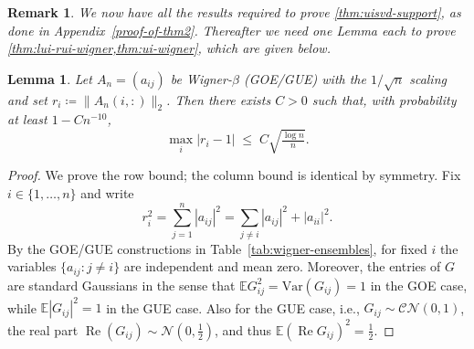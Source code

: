 \documentclass[11pt,a4paper]{article}
\newtheorem{lemma}[theorem]{Lemma}
\newtheorem{remark}{Remark}[section]
\newcommand{\E}{\mathbb{E}}
\newcommand{\Var}{\mathrm{Var}}
\begin{document}
\begin{remark}
We now have all the results required to prove \cref{thm:uisvd-support}, as done in Appendix~\ref{proof-of-thm2}. Thereafter we need one Lemma each to prove \cref{thm:lui-rui-wigner,thm:ui-wigner}, which are given below.
\end{remark}
\begin{lemma}\label{lem:wigner-rowcol-norms}
Let $A_n = (a_{ij})$ be Wigner-$\beta$ (GOE/GUE) with the $1/\sqrt n$ scaling and set
$r_i\coloneq \|A_n(i,:)\|_2$.
Then there exists $C>0$ such that, with probability at least $1-C n^{-10}$,
\begin{equation}\label{eq:wigner-rowcol-norms}
\max_i \bigl|r_i-1\bigr| \;\le\; C\sqrt{\tfrac{\log n}{n}}.
\end{equation}
\end{lemma}
\begin{proof}
We prove the row bound; the column bound is identical by symmetry. Fix $i\in\{1,\dots,n\}$ and write
\begin{equation}
r_i^2=\sum_{j=1}^n |a_{ij}|^2=\sum_{j\neq i}|a_{ij}|^2+|a_{ii}|^2.
\end{equation}
By the GOE/GUE constructions in Table~\ref{tab:wigner-ensembles}, for fixed $i$ the variables $\{a_{ij}:j\neq i\}$ are independent and mean zero.
Moreover, the entries of $G$ are standard Gaussians in the sense that $\E G_{ij}^2=\Var(G_{ij})=1$ in the GOE case, while $\E|G_{ij}|^2=1$ in the GUE case. Also for the GUE case, i.e., $G_{ij}\sim \mathcal{CN}(0,1)$, the real part $\operatorname{Re}(G_{ij})\sim \mathcal N(0,\frac{1}{2})$, and thus $\E(\operatorname{Re}G_{ij})^2=\frac{1}{2}$.


\end{proof}
\end{document}
